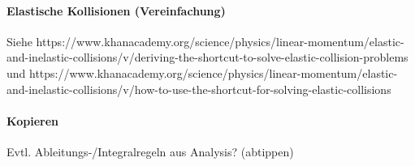 \paragraph{Elastische Kollisionen (Vereinfachung)}

Siehe https://www.khanacademy.org/science/physics/linear-momentum/elastic-and-inelastic-collisions/v/deriving-the-shortcut-to-solve-elastic-collision-problems und https://www.khanacademy.org/science/physics/linear-momentum/elastic-and-inelastic-collisions/v/how-to-use-the-shortcut-for-solving-elastic-collisions

\paragraph{Kopieren}

Evtl. Ableitungs-/Integralregeln aus Analysis? (abtippen)